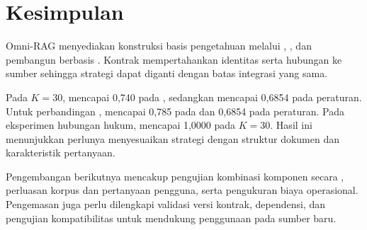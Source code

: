\section{Kesimpulan}
Omni-RAG menyediakan konstruksi basis pengetahuan melalui , , dan pembangun  berbasis . Kontrak  mempertahankan identitas serta hubungan ke sumber sehingga strategi dapat diganti dengan batas integrasi yang sama.

Pada $K = 30$,  mencapai  0,740 pada , sedangkan  mencapai 0,6854 pada peraturan. Untuk perbandingan ,  mencapai 0,785 pada  dan 0,6854 pada peraturan. Pada eksperimen hubungan hukum,  mencapai  1,0000 pada $K = 30$. Hasil ini menunjukkan perlunya menyesuaikan strategi dengan struktur dokumen dan karakteristik pertanyaan.

Pengembangan berikutnya mencakup pengujian kombinasi komponen secara , perluasan korpus dan pertanyaan pengguna, serta pengukuran biaya operasional. Pengemasan  juga perlu dilengkapi validasi versi kontrak, dependensi, dan pengujian kompatibilitas untuk mendukung penggunaan pada sumber baru.
